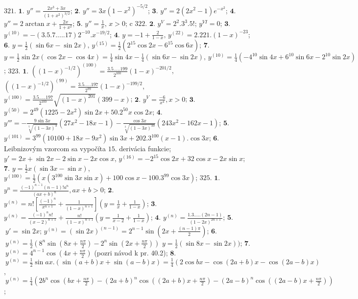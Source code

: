 $\boxed{321.}$ $\boldsymbol{1.}$  $y''=\frac{2x^{3}+3x}{(1+x^{2})^{3/2}} $;
$\boldsymbol{2.}$  $y''=3x(1-x^{2})^{-5/2} $;   
$\boldsymbol{3.}$  $y''=2(2x^{2}-1)e^{-x^{2}} $;   
$\boldsymbol{4.}$  $y''=2\arctan x+\frac{2x}{1+x^{2}} $;
$\boldsymbol{5.}$  $y''=\frac{1}{x}, \, x>0 $;
c
$\boxed{322.}$ $\boldsymbol{2.}$  $y^{V}=2^{2}.3^{3}.5! $; $y^{VI}=0$;
$\boldsymbol{3.}$  $y^{(10)}=-(3.5.7.....17)2^{-10}.x^{-19/2}$;
$\boldsymbol{4.}$  $y=-1+\frac{2}{1-x}, \, y^{(22)}=2.221.(1-x)^{-23} $;
$\boldsymbol{6.}$  $y=\frac{1}{2}(\sin 6x-\sin 2x), \, y^{(15)}=\frac{1}{2}(2^{15}\cos 2x -6^{15}\cos 6x) $;
$\boldsymbol{7.}$  $y=\frac{1}{2}\sin 2x(\cos 2x-\cos 4x)= \frac{1}{4}\sin 4x -\frac{1}{4}(\sin 6x-\sin 2x) , \, y^{(10)}=\frac{1}{4}(-4^{10}\sin 4x +6^{10}\sin 6x-2^{10}\sin 2x) $;
$\boxed{323.}$ $\boldsymbol{1.}$  $((1-x)^{-1/2})^{(100)}=\frac{3.5.....199}{2^{100}}(1-x)^{-201/2} $, $((1-x)^{-1/2})^{(99)}=\frac{3.5.....197}{2^{99}}(1-x)^{-199/2} $, $y^{(100)}=\frac{3.5.....197}{2^{100}}\sqrt{(1-x)^{201}}(399-x) $;
$\boldsymbol{2.}$  $y^{V}=\frac{-6}{x^{4}}, x>0$;
$\boldsymbol{3.}$  $y^{(50)}=2^{49}(1225-2x^{2})\sin 2x + 50.2^{50}x \cos 2x$;
$\boldsymbol{4.}$  $y'''=-\frac{9\sin 3x}{\sqrt[7]{(1-3x)^{3}}}(27x^{2}-18x-1)-\frac{\cos 3x}{\sqrt[3]{(1-3x)^{10}}}(243x^{2}-162x-1)$;
$\boldsymbol{5.}$  $y^{(101)}=3^{99}(10100+18x-9x^{2})\sin 3x + 202.3^{100}(x-1). \cos 3x$;
$\boldsymbol{6.}$ Leibnizovým vzorcom sa vypočíta  $15$. derivácia funkcie; $y'=2x+\sin 2x - 2 \sin x-2x \cos x$,   $y^{(16)}=-2^{15}\cos 2x+32 \cos x - 2x \sin x$; 
$\boldsymbol{7.}$  $y=\frac{1}{2}x(\sin 3x -\sin x)$, $y^{(100)}=\frac{1}{2}(x(3^{100}\sin 3x \sin x)+100\cos x - 100.3^{99}\cos 3x)$;
$\boxed{325.}$ $\boldsymbol{1.}$ $y^{n}=\frac{(-1)^{n-1}(n-1)!a^{n}}{(ax+b)^{n}}, ax+b>0$;
$\boldsymbol{2.}$ $y^{(n)}=n![\frac{(-1)^{n}}{x^{n+1}}+\frac{1}{(1-x)^{n+1}}](y=\frac{1}{x}+\frac{1}{1-x}) $;
$\boldsymbol{3.}$ $y^{(n)}=\frac{(-1)^{n}n!}{(x-2)^{n+1}}+\frac{n!}{(1-x)^{n+1}}(y=\frac{1}{x-2}+\frac{1}{1-x}) $;
$\boldsymbol{4.}$ $y^{(n)}=\frac{1.3.....(2n-1)}{(1-2x)^{2n+1}}$;
$\boldsymbol{5.}$  $\ y'=\sin 2x$;  $y^{(n)}=(\sin 2x)^{(n-1)}=2^{n-1}\sin (2x+\frac{(n-1)\pi}{2})$;
$\boldsymbol{6.}$  $\ y^{(n)}=\frac{1}{2}(8^{n}\sin (8x+\frac{n\pi}{2})-2^{n}\sin (2x+\frac{n\pi}{2}))$  $y=\frac{1}{2}(\sin 8x- \sin 2x))$;
$\boldsymbol{7.}$  $\ y^{(n)}=4^{n-1}\cos (4x+\frac{n\pi}{2})$ (pozri návod k pr. 40.2);
$\boldsymbol{8.}$  $\ y^{(n)}=\frac{1}{2} \sin ax.(\sin (a+b)x +\sin (a-b)x)=\frac{1}{4}(2\cos bx-\cos(2a+b)x -\cos (2a-b)x)$, $\ y^{(n)}=\frac{1}{4} (2b^{n} \cos(bx+\frac{n\pi}{2})-(2a+b)^{n}\cos ((2a+b)x+\frac {n\pi}{2})-(2a-b)^{n}\cos ((2a-b)x+\frac{n\pi}{2}))$;
